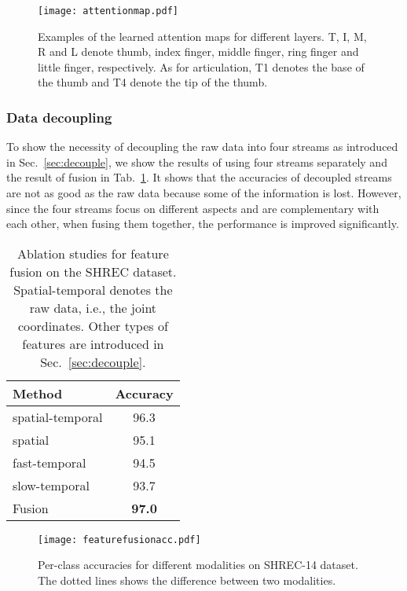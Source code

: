 \documentclass[runningheads]{llncs}
\begin{document}
\begin{figure}[!htb]
    \centering
    \texttt{[image: attentionmap.pdf]}
    \caption{Examples of the learned attention maps for different layers. T, I, M, R and L denote thumb, index finger, middle finger, ring finger and little finger, respectively. As for articulation, T1 denotes the base of the thumb and T4 denote the tip of the thumb.}
    \label{fig:attentionmap}
\end{figure}{}

\subsubsection{Data decoupling}
To show the necessity of decoupling the raw data into four streams as introduced in Sec.~\ref{sec:decouple}, we show the results of using four streams separately and the result of fusion in Tab.~\ref{tab:ablation_fusion}.
It shows that the accuracies of decoupled streams are not as good as the raw data because some of the information is lost. 
However, since the four streams focus on different aspects and are complementary with each other, when fusing them together, the performance is improved significantly. 

\begin{table}[!htp]
    \centering
    \caption{Ablation studies for feature fusion on the SHREC dataset. Spatial-temporal denotes the raw data, i.e., the joint coordinates. Other types of features are introduced in Sec.~\ref{sec:decouple}.}
    \renewcommand\tabcolsep{5.0pt} \begin{tabular}{lc}
    \hline
    Method & Accuracy \\
    \hline
    spatial-temporal        &  96.3 \\
    spatial         &  95.1 \\
    fast-temporal   &  94.5\\
    slow-temporal   &  93.7 \\
    \hline
    Fusion          &  \textbf{97.0}\\
    \hline
    \end{tabular}
    \label{tab:ablation_fusion}
\end{table}{}

\begin{figure}[!htb]
    \centering
    \texttt{[image: featurefusionacc.pdf]}
    \caption{Per-class accuracies for different modalities on SHREC-14 dataset. The dotted lines shows the difference between two modalities.}
    \label{fig:featurefusionacc}
\end{figure}{}
\end{document}
